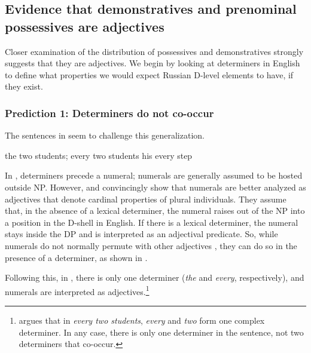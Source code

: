 \documentclass[output=paper]{langscibook}
\begin{document}
\subsection{Evidence that demonstratives and prenominal possessives are adjectives}

Closer examination of the distribution of possessives and demonstratives strong\-ly suggests that they are adjectives. We begin by looking at determiners in English to define what properties we would expect Russian D-level elements to have, if they exist.

\subsubsection{Prediction 1: Determiners do not co-occur}


\ea{}
\z\z

\noindent The sentences in  seem to challenge this generalization.


\ea\label{determiners}
    \ea the two students; every two students\label{twostudents}
    \ex his every step\label{hisstep}
\z\z

\noindent In , determiners precede a numeral; numerals are generally assumed to be hosted outside NP. However, \citet{Landman2003,Landman2004} and \citet{Rothstein2013,Rothstein2017} convincingly show that numerals are better analyzed as adjectives that denote cardinal properties of plural individuals. They assume that, in the absence of a lexical determiner, the numeral raises out of the NP into a position in the D-shell in English. If there is a lexical determiner, the numeral stays inside the DP and is interpreted as an adjectival predicate. So, while numerals do not normally permute with other adjectives , they can do so in the presence of a determiner, as shown in . 


\ea
    \label{fiftylions}
     \hfill \citep[217]{Landman2003}
\z\z

\noindent Following this, in , there is only one determiner (\textit{the} and \textit{every}, respectively), and numerals are interpreted as adjectives.\footnote{\citet{Landman2004} argues that in \textit{every two students}, \textit{every} and \textit{two} form one complex determiner. In any case, there is only one determiner in the sentence, not two determiners that co-occur.}
\end{document}
